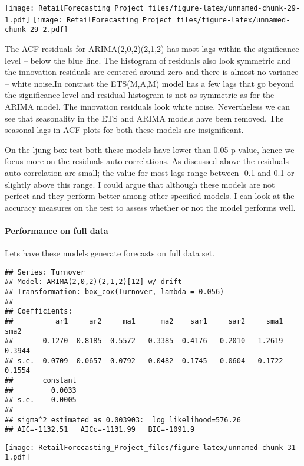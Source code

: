 \documentclass[
]{article}
\begin{document}
\texttt{[image: RetailForecasting\_Project\_files/figure-latex/unnamed-chunk-29-1.pdf]}
\texttt{[image: RetailForecasting\_Project\_files/figure-latex/unnamed-chunk-29-2.pdf]}

The ACF residuals for ARIMA(2,0,2)(2,1,2) has most lags within the
significance level -- below the blue line. The histogram of residuals
also look symmetric and the innovation residuals are centered around
zero and there is almost no variance -- white noise.In contrast the
ETS(M,A,M) model has a few lags that go beyond the significance level
and residual histogram is not as symmetric as for the ARIMA model. The
innovation residuals look white noise. Nevertheless we can see that
seasonality in the ETS and ARIMA models have been removed. The seasonal
lags in ACF plots for both these models are insignificant.

On the ljung box test both these models have lower than 0.05 p-value,
hence we focus more on the residuals auto correlations. As discussed
above the residuals auto-correlation are small; the value for most lags
range between -0.1 and 0.1 or slightly above this range. I could argue
that although these models are not perfect and they perform better among
other specified models. I can look at the accuracy measures on the test
to assess whether or not the model performs well.

\hypertarget{performance-on-full-data}{%
\paragraph{Performance on full data}\label{performance-on-full-data}}

Lets have these models generate forecasts on full data set.

\begin{verbatim}
## Series: Turnover 
## Model: ARIMA(2,0,2)(2,1,2)[12] w/ drift 
## Transformation: box_cox(Turnover, lambda = 0.056) 
## 
## Coefficients:
##          ar1     ar2     ma1      ma2    sar1     sar2     sma1    sma2
##       0.1270  0.8185  0.5572  -0.3385  0.4176  -0.2010  -1.2619  0.3944
## s.e.  0.0709  0.0657  0.0792   0.0482  0.1745   0.0604   0.1722  0.1554
##       constant
##         0.0033
## s.e.    0.0005
## 
## sigma^2 estimated as 0.003903:  log likelihood=576.26
## AIC=-1132.51   AICc=-1131.99   BIC=-1091.9
\end{verbatim}

\texttt{[image: RetailForecasting\_Project\_files/figure-latex/unnamed-chunk-31-1.pdf]}
\end{document}
